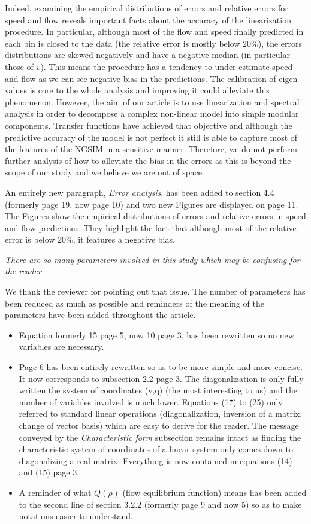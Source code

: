 \documentclass{article}
\begin{document}
Indeed, examining the empirical distributions of errors and relative errors for speed and flow reveals important facts about the accuracy of the linearization procedure. In particular, although most of the flow and speed finally predicted in each bin is closed to the data (the relative error is mostly below $20\%$), the errors distributions are skewed negatively and have a negative median (in particular those of $v$). This means the procedure has a tendency to under-estimate speed and flow as we can see negative bias in the predictions. The calibration of eigen values is core to the whole analysis and improving it could alleviate this phenomenon. However, the aim of our article is to use linearization and spectral analysis in order to decompose a complex non-linear model into simple modular components. Transfer functions have achieved that objective and although the predictive accuracy of the model is not perfect it still is able to capture most of the features of the NGSIM in a sensitive manner. Therefore, we do not perform further analysis of how to alleviate the bias in the errors as this is beyond the scope of our study and we believe we are out of space.

An entirely new paragraph, \textit{Error analysis}, has been added to section 4.4 (formerly page 19, now page 10) and two new Figures are displayed on page 11. The Figures show the empirical distributions of errors and relative errors in speed and flow predictions. They highlight the fact that although most of the relative error is below $20\%$, it features a negative bias. 

\bigskip{}

\emph{
There are so many parameters involved in this study which may be confusing for the reader.
}

We thank the reviewer for pointing out that issue. The number of parameters has been reduced as much as possible and reminders of the meaning of the parameters have been added throughout the article.

\begin{itemize}
\item Equation formerly 15 page 5, now 10 page 3, has been rewritten so no new variables are necessary.
\item Page 6 has been entirely rewritten so as to be more simple and more concise. It now corresponds to subsection 2.2 page 3. The diagonalization is only fully written the system of coordinates (v,q) (the most interesting to us) and the number of variables involved is much lower. Equations (17) to (25) only referred to standard linear operations (diagonalization, inversion of a matrix, change of vector basis) which are easy to derive for the reader. The message conveyed by the \textit{Characteristic form} subsection remains intact as finding the characteristic system of coordinates of a linear system only comes down to diagonalizing a real matrix. Everything is now contained in equations (14) and (15) page 3.
\item A reminder of what $Q(\rho)$ (flow equilibrium function) means has been added to the second line of section 3.2.2 (formerly page 9 and now 5) so as to make notations easier to understand.
\end{itemize}
\end{document}
